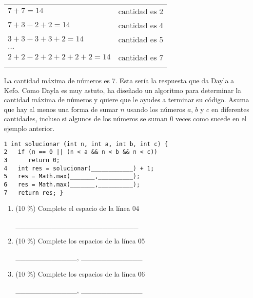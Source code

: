 \documentclass[twocolumn]{article}
\begin{document}
\begin{tabular}{l l}
$7 + 7 = 14$  &                  cantidad es 2 \\
$7 + 3 + 2 + 2 = 14$ &          cantidad es 4 \\
$3 + 3 + 3 + 3 + 2 = 14$  &  cantidad es 5 \\
$\dots$ & \\
$2 + 2 + 2 + 2 + 2 + 2 + 2 = 14$ & cantidad es 7 \\\\
\end{tabular}

La cantidad máxima de números es 7. Esta sería la respuesta que da Dayla a Kefo. 
Como Dayla es muy astuto, ha diseñado un algoritmo para determinar la cantidad máxima de números y quiere que le ayudes a terminar su código. Asuma que hay al menos una forma de sumar $n$ usando los números $a$, $b$ y $c$ en diferentes cantidades, incluso
si algunos de los números se suman $0$ veces como sucede en el ejemplo anterior.

{\small
\begin{verbatim}
1 int solucionar (int n, int a, int b, int c) {
2   if (n == 0 || (n < a && n < b && n < c))
3      return 0;
4   int res = solucionar(____________) + 1;
5   res = Math.max(_______,__________);  
6   res = Math.max(_______,__________);
7   return res; }
\end{verbatim}
}

\begin{enumerate}[label=\Alph*]


	\item (10 \%) Complete el espacio de la línea 04

	\_\_\_\_\_\_\_\_\_\_\_\_\_\_\_\_\_\_\_\_\_\_\_\_

	\item (10 \%) Complete los espacios de la línea 05

	\_\_\_\_\_\_\_\_\_\_\_\_, \_\_\_\_\_\_\_\_\_\_\_\_

	\item (10 \%) Complete los espacios de la línea 06	

	\_\_\_\_\_\_\_\_\_\_\_\_, \_\_\_\_\_\_\_\_\_\_\_\_
\end{enumerate} 


\end{document}
